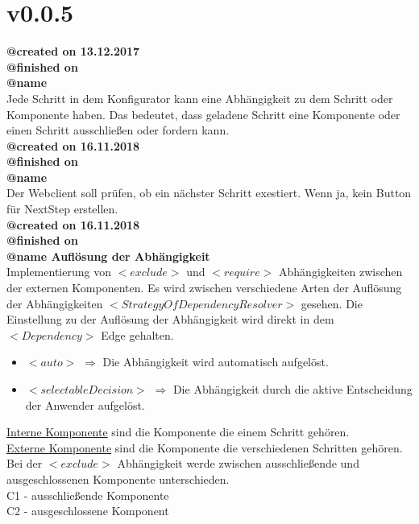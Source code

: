 \documentclass{article}
\begin{document}
\section{v0.0.5}

\textbf{@created on 13.12.2017}\\
\textbf{@finished on} \\
\textbf{@name }\\

\noindent Jede Schritt in dem Konfigurator kann eine Abhängigkeit zu dem Schritt oder
Komponente haben. Das bedeutet, dass geladene Schritt eine Komponente oder einen
Schritt ausschlie\ss{}en oder fordern kann.\\

\noindent \textbf{@created on 16.11.2018}\\
\textbf{@finished on }\\
\textbf{@name }\\

\noindent Der Webclient soll prüfen, ob ein nächster Schritt exestiert. Wenn ja, kein Button für NextStep erstellen.\\

\noindent \textbf{@created on 16.11.2018}\\
\textbf{@finished on} \\
\textbf{@name Auflösung der Abhängigkeit}\\

\noindent Implementierung von $<exclude>$ und $<require>$ Abhängigkeiten zwischen der externen Komponenten.
Es wird zwischen verschiedene Arten der Auflösung der Abhängigkeiten $<StrategyOfDependencyResolver>$ gesehen.
Die Einstellung zu der Auflösung der Abhängigkeit wird direkt in dem $<Dependency>$ Edge gehalten.

\begin{itemize}
    \item $<auto>$ $\Rightarrow$ Die Abhängigkeit wird automatisch aufgelöst.
    \item $<selectableDecision>$ $\Rightarrow$ Die Abhängigkeit durch 
    die aktive Entscheidung der Anwender aufgelöst. 
\end{itemize}

\noindent\underline{Interne Komponente} sind die Komponente die einem Schritt gehören.\\
\underline{Externe Komponente} sind die Komponente die verschiedenen Schritten gehören.\\

\noindent Bei der $<exclude>$ Abhängigkeit werde zwischen ausschließende und ausgeschlossenen 
Komponente unterschieden.\\
C1 - ausschließende Komponente\\
C2 - ausgeschlossene Komponent\\
\end{document}
